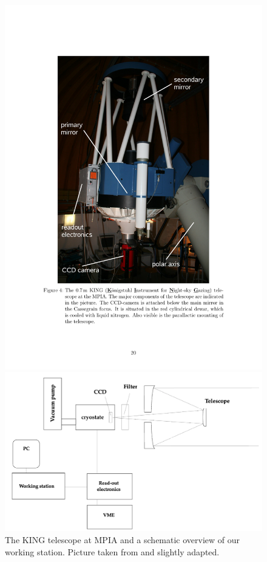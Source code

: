 \begin{figure}[H]
	\begin{minipage}{0.4\textwidth}
	\hspace{0.8cm}
		\includegraphics[scale = 0.4]{figures/Experimental Setup/image_layout}
	\end{minipage}
	\begin{minipage}{0.4\textwidth}
		\hspace{0.8cm}
		\includegraphics[scale=0.2]{figures/Experimental Setup/layout_eng}
	\end{minipage}

	\caption[The KING telescope at MPIA]{The KING telescope at MPIA and a schematic overview of our working station. Picture taken from \cite{Pott2017} and slightly adapted.}
\end{figure}  

